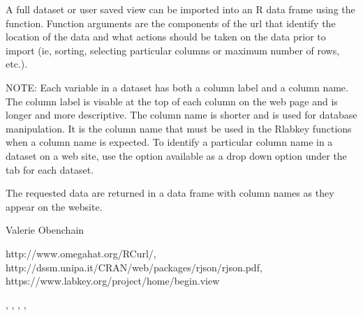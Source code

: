 \begin{Details}\relax
A full dataset or user saved view can be imported into an R data frame using the 
 function. Function arguments are the components of the url that identify
the location of the data and what actions should be taken on the data prior to import
(ie, sorting, selecting particular columns or maximum number of rows, etc.).

NOTE: Each variable in a dataset has both a column label and a column name. The column label is visable at the top
of each column on the web page and is longer and more descriptive. The column name is shorter and is
used  for database manipulation. It is the column name that must be used in
the Rlabkey functions when a column name is expected. To identify a particular column name in a dataset on
a web site, use the  option available as a drop down option under the 
tab for each dataset.
\end{Details}
\begin{Value}
The requested data are returned in a data frame with column names as they appear on the website.
\end{Value}
\begin{Author}\relax
Valerie Obenchain
\end{Author}
\begin{References}\relax
http://www.omegahat.org/RCurl/,\\ 
http://dssm.unipa.it/CRAN/web/packages/rjson/rjson.pdf,\\
https://www.labkey.org/project/home/begin.view
\end{References}
\begin{SeeAlso}\relax
{}, , , 
, 
\end{SeeAlso}
